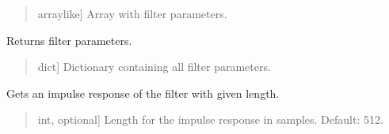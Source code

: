 \documentclass[letterpaper,10pt,english]{sphinxmanual}
\begin{document}
\begin{fulllineitems}
\begin{fulllineitems}
\begin{quote}
\begin{description}
\begin{description}
\sphinxlineitem{\sphinxstylestrong{coefficients}}{[}array\sphinxhyphen{}like{]}
\sphinxAtStartPar
Array with filter parameters.

\end{description}

\end{description}\end{quote}

\end{fulllineitems}


\begin{fulllineitems}
\label{\detokenize{classes:dsptools.classes.filter_class.Filter.get_filter_parameters}}
\pysigstartsignatures
{}
\pysigstopsignatures
\sphinxAtStartPar
Returns filter parameters.
\begin{quote}\begin{description}
\begin{description}
\sphinxlineitem{\sphinxstylestrong{info}}{[}dict{]}
\sphinxAtStartPar
Dictionary containing all filter parameters.

\end{description}

\end{description}\end{quote}

\end{fulllineitems}


\begin{fulllineitems}
\label{\detokenize{classes:dsptools.classes.filter_class.Filter.get_ir}}
\pysigstartsignatures
{}
\pysigstopsignatures
\sphinxAtStartPar
Gets an impulse response of the filter with given length.
\begin{quote}\begin{description}
\begin{description}
\sphinxlineitem{\sphinxstylestrong{length\_samples}}{[}int, optional{]}
\sphinxAtStartPar
Length for the impulse response in samples. Default: 512.


\end{description}
\end{description}
\end{quote}
\end{fulllineitems}
\end{fulllineitems}
\end{document}
